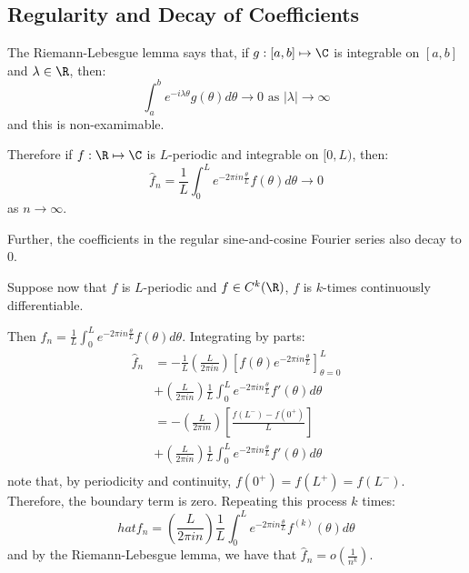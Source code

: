 \documentclass[../Main.tex]{subfiles}
\begin{document}
\subsection{Regularity and Decay of Coefficients}
\begin{remark}
    The Riemann-Lebesgue lemma says that, if $g : [a, b] \mapsto \C$ is integrable on $[a, b]$ and $\lambda \in \R$, then:
    \begin{equation*}
        \int_{a}^{b} e^{-i\lambda \theta}g(\theta) d\theta \to 0 \text{ as } |\lambda| \to \infty
    \end{equation*}
    and this is non-examimable.

    Therefore if $f : \R \mapsto \C$ is $L$-periodic and integrable on $[0, L)$, then:
    \begin{equation*}
        \hat{f}_n = \frac{1}{L} \int_{0}^{L} e^{-2\pi i n \frac\theta{L}}f(\theta) d\theta \to 0
    \end{equation*}
    as $n \to \infty$.

    Further, the coefficients in the regular sine-and-cosine Fourier series also decay to $0$.
\end{remark}
Suppose now that $f$ is $L$-periodic and $f \in C^k(\R)$, $f$ is $k$-times continuously differentiable.

Then $\hat{f}_n = \frac{1}{L} \int_{0}^{L} e^{-2\pi i n \frac{\theta}{L}} f(\theta) d\theta$. Integrating by parts:
\begin{align*}
    \hat{f}_n &= -\frac{1}{L} \left(\frac{L}{2\pi i n}\right)\left[f(\theta) e^{-2\pi i n \frac{\theta}{L}} \right]_{\theta = 0}^L \\
    &+ \left(\frac{L}{2\pi i n}\right)\frac{1}{L}\int_{0}^{L} e^{-2\pi i n \frac{\theta}{L}}f'(\theta) d\theta \\
    &= -\left(\frac{L}{2\pi i n}\right) \left[\frac{f(L^-) - f(0^+)}{L}\right] \\
    &+ \left(\frac{L}{2\pi i n}\right)\frac{1}{L} \int_{0}^{L} e^{-2\pi i n \frac{\theta}{L}} f'(\theta) d\theta \\
\end{align*}
note that, by periodicity and continuity, $f(0^+) = f(L^+) = f(L^-)$. Therefore, the boundary term is zero. Repeating this process $k$ times:
\begin{equation*}
    hat{f}_n = \left(\frac{L}{2\pi i n}\right)\frac{1}{L} \int_{0}^{L} e^{-2\pi i n \frac{\theta}{L}} f^{(k)}(\theta) d\theta 
\end{equation*}
and by the Riemann-Lebesgue lemma, we have that $\hat{f}_n = o\left(\frac{1}{n^k}\right)$.
\end{document}
